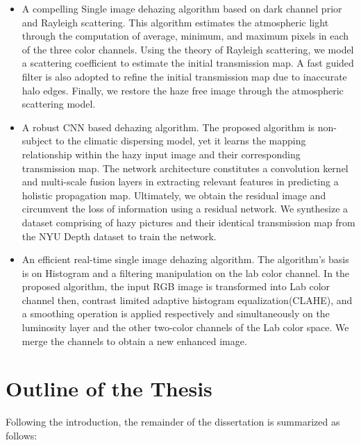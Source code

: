 \documentclass[doctor,english,listoffigures,listoftables]{thesis-uestc}
\begin{document}
\begin{itemize}
	\item A compelling Single image dehazing algorithm based on dark channel prior and Rayleigh scattering. This algorithm estimates the atmospheric light through the computation of average, minimum, and maximum pixels in each of the three color channels. Using the theory of Rayleigh scattering, we model a scattering coefficient to estimate the initial transmission map. A fast guided filter is also adopted to refine the initial transmission map due to inaccurate halo edges. Finally, we restore the haze free image through the atmospheric scattering model.  
	
	\item A robust CNN based dehazing algorithm. The proposed algorithm is non-subject to the climatic dispersing model, yet it learns the mapping relationship within the hazy input image and their corresponding transmission map. The network architecture constitutes a convolution kernel and multi-scale fusion layers in extracting relevant features in predicting a holistic propagation map. Ultimately, we obtain the residual image and circumvent the loss of information using a residual network. We synthesize a dataset comprising of hazy pictures and their identical transmission map from the NYU Depth dataset to train the network.
	
	\item An efficient real-time single image dehazing algorithm. The algorithm's basis is on Histogram and a filtering manipulation on the lab color channel. In the proposed algorithm, the input RGB image is transformed into Lab color channel then, contrast limited adaptive histogram equalization(CLAHE), and a smoothing operation is applied respectively and simultaneously on the luminosity layer and the other two-color channels of the Lab color space. We merge the channels to obtain a new enhanced image. 
	
\end{itemize}

\section{Outline of the Thesis}
Following the introduction, the remainder of the dissertation is summarized as follows: 
\end{document}
